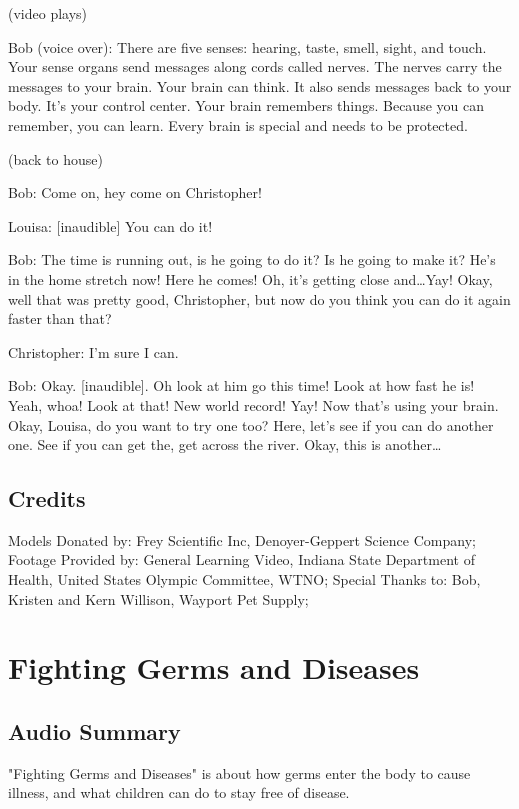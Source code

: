 (video plays)

Bob (voice over): There are five senses: hearing, taste, smell, sight, and touch. Your sense organs send messages along cords called nerves. The nerves carry the messages to your brain. Your brain can think. It also sends messages back to your body. It's your control center. Your brain remembers things. Because you can remember, you can learn. Every brain is special and needs to be protected.

(back to house)

Bob: Come on, hey come on Christopher!

Louisa: [inaudible] You can do it!

Bob: The time is running out, is he going to do it? Is he going to make it? He's in the home stretch now! Here he comes! Oh, it's getting close and\dots Yay! Okay, well that was pretty good, Christopher, but now do you think you can do it again faster than that?

Christopher: I'm sure I can.

Bob: Okay. [inaudible]. Oh look at him go this time! Look at how fast he is! Yeah, whoa! Look at that! New world record! Yay! Now that's using your brain. Okay, Louisa, do you want to try one too? Here, let's see if you can do another one. See if you can get the, get across the river. Okay, this is another\dots

\subsection{Credits}

Models Donated by: Frey Scientific Inc, Denoyer-Geppert Science Company;
Footage Provided by: General Learning Video, Indiana State Department of Health, United States Olympic Committee, WTNO;
Special Thanks to: Bob, Kristen and Kern Willison, Wayport Pet Supply;

\section{Fighting Germs and Diseases}

\subsection{Audio Summary}

"Fighting Germs and Diseases" is about how germs enter the body to cause illness, and what children can do to stay free of disease.

